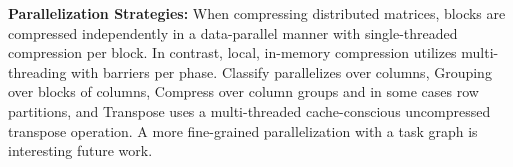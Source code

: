 \textbf{Parallelization Strategies:} When compressing distributed matrices, blocks are compressed independently in a data-parallel manner with single-threaded compression per block. In contrast, local, in-memory compression utilizes multi-threading with barriers per phase. Classify parallelizes over columns, Grouping over blocks of columns, Compress over column groups and in some cases row partitions, and Transpose uses a multi-threaded cache-conscious uncompressed transpose operation. A more fine-grained parallelization with a task graph \cite{MoritzNWTLLEYPJ18} is interesting future work.
